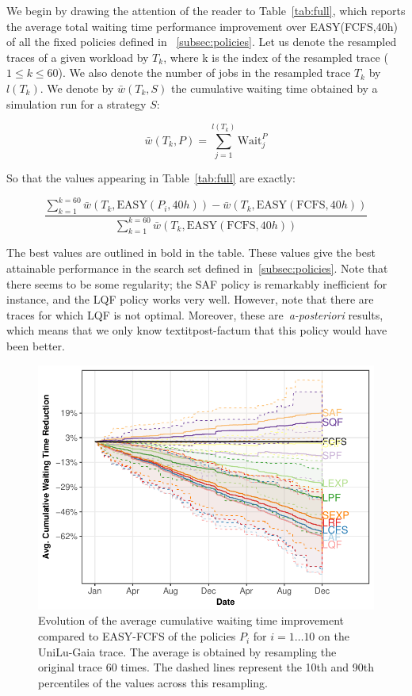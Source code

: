 \documentclass[sigconf,anonymous]{acmart}
\begin{document}
We begin by drawing the attention of the reader to Table~\ref{tab:full}, which
reports the average total waiting time performance improvement over
EASY(FCFS,40h) of all the fixed policies defined in ~\ref{subsec:policies}. Let
us denote the resampled traces of a given workload by $T_k$, where k is the
index of the resampled trace ($1 \le k \le 60$). We also denote the number of
jobs in the resampled trace $T_k$ by $l(T_k)$. We denote by $\bar{w}(T_k,S)$
the cumulative waiting time obtained by a simulation run for a strategy $S$:

\begin{equation}
  \bar{w}(T_k,P) = \sum_{j=1}^{l(T_k)} \text{Wait}_j^{P}
\end{equation}

So that the values appearing in Table~\ref{tab:full} are exactly:

\begin{equation} \label{eq:cum}
  \frac{\sum_{k=1}^{k=60}\bar{w}(T_k,\text{EASY}(P_i,40h))-
  \bar{w}(T_k,\text{EASY}(\text{FCFS},40h))}{\sum_{k=1}^{k=60}\bar{w}(T_k,\text{EASY}(\text{FCFS},40h))}
\end{equation}

The best values are outlined in bold in the table. These values give the best
attainable performance in the search set defined in~\ref{subsec:policies}.
Note that there seems to be some regularity; the SAF policy is remarkably
inefficient for instance, and the LQF policy works very well. However, note
that there are traces for which LQF is not optimal. Moreover, these
are~\textit{a-posteriori} results, which means that we only know
textit{post-factum} that this policy would have been better.


\begin{figure}[]
  \centering
  \includegraphics[scale=0.6]{figures/full-UniLu-Ga.pdf}
  \caption{Evolution of the average cumulative waiting time improvement
    compared to EASY-FCFS of the policies $P_i$ for $i = 1 \ldots 10$ on the
    UniLu-Gaia trace. The average is obtained by resampling the original trace
    60 times. The dashed lines represent the 10th and 90th percentiles of the
  values across this resampling.}
  \label{fig:all}
\end{figure}
\end{document}
